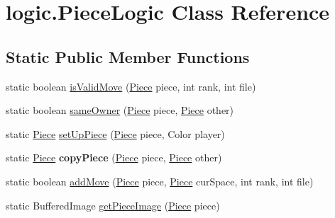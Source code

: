 \hypertarget{classlogic_1_1PieceLogic}{\section{logic.\-Piece\-Logic Class Reference}
\label{classlogic_1_1PieceLogic}
}
\subsection*{Static Public Member Functions}
\begin{DoxyCompactItemize}
\item 
static boolean \hyperlink{classlogic_1_1PieceLogic_aac7446d10b195afb378411addcf5b93a}{is\-Valid\-Move} (\hyperlink{classpiece_1_1Piece}{Piece} piece, int rank, int file)
\item 
static boolean \hyperlink{classlogic_1_1PieceLogic_a93161b8617563e7e01657c47e63187db}{same\-Owner} (\hyperlink{classpiece_1_1Piece}{Piece} piece, \hyperlink{classpiece_1_1Piece}{Piece} other)
\item 
static \hyperlink{classpiece_1_1Piece}{Piece} \hyperlink{classlogic_1_1PieceLogic_a82d3489e7f023e7248abab45768ecf45}{set\-Up\-Piece} (\hyperlink{classpiece_1_1Piece}{Piece} piece, Color player)
\item 
\hypertarget{classlogic_1_1PieceLogic_ae9554b341dd00ca6bc8ec352225276c4}{static \hyperlink{classpiece_1_1Piece}{Piece} {\bfseries copy\-Piece} (\hyperlink{classpiece_1_1Piece}{Piece} piece, \hyperlink{classpiece_1_1Piece}{Piece} other)}\label{classlogic_1_1PieceLogic_ae9554b341dd00ca6bc8ec352225276c4}

\item 
static boolean \hyperlink{classlogic_1_1PieceLogic_a89579badd601a4707cd3a45ee7934bf0}{add\-Move} (\hyperlink{classpiece_1_1Piece}{Piece} piece, \hyperlink{classpiece_1_1Piece}{Piece} cur\-Space, int rank, int file)
\item 
static Buffered\-Image \hyperlink{classlogic_1_1PieceLogic_a25890c82076e10599f19590780feb29c}{get\-Piece\-Image} (\hyperlink{classpiece_1_1Piece}{Piece} piece)
\end{DoxyCompactItemize}


